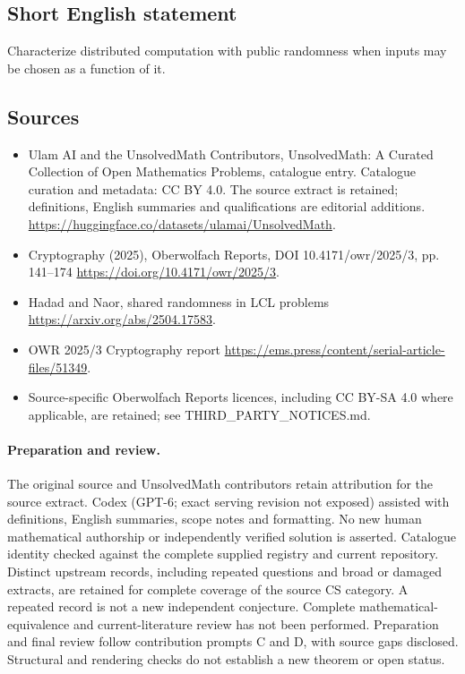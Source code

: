 \documentclass[11pt]{article}
\begin{document}
\subsection{Short English statement}
Characterize distributed computation with public randomness when inputs may be chosen as a function of it.
\subsection{Sources}
\begin{itemize}
\item[\hypertarget{source:statement:1}{S1}] Ulam AI and the UnsolvedMath Contributors, UnsolvedMath: A Curated Collection of Open Mathematics Problems, catalogue entry. Catalogue curation and metadata: CC BY 4.0. The source extract is retained; definitions, English summaries and qualifications are editorial additions.
\url{https://huggingface.co/datasets/ulamai/UnsolvedMath}.
\item[\hypertarget{source:statement:2}{S2}] Cryptography (2025), Oberwolfach Reports, DOI 10.4171/owr/2025/3, pp. 141--174
\url{https://doi.org/10.4171/owr/2025/3}.
\item[\hypertarget{source:statement:3}{S3}] Hadad and Naor, shared randomness in LCL problems
\url{https://arxiv.org/abs/2504.17583}.
\item[\hypertarget{source:statement:4}{S4}] OWR 2025/3 Cryptography report
\url{https://ems.press/content/serial-article-files/51349}.
\item Source-specific Oberwolfach Reports licences, including CC BY-SA 4.0 where applicable, are retained; see THIRD\_PARTY\_NOTICES.md.
\end{itemize}
\paragraph{Preparation and review.}
The original source and UnsolvedMath contributors retain attribution for the source extract. Codex (GPT-6; exact serving revision not exposed) assisted with definitions, English summaries, scope notes and formatting. No new human mathematical authorship or independently verified solution is asserted. Catalogue identity checked against the complete supplied registry and current repository. Distinct upstream records, including repeated questions and broad or damaged extracts, are retained for complete coverage of the source CS category. A repeated record is not a new independent conjecture. Complete mathematical-equivalence and current-literature review has not been performed. Preparation and final review follow contribution prompts C and D, with source gaps disclosed. Structural and rendering checks do not establish a new theorem or open status.
\label{end:statement}
\end{document}
